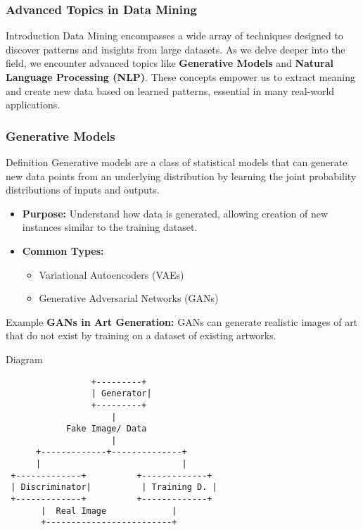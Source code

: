 \documentclass[aspectratio=169]{beamer}
\begin{document}
\begin{frame}
    \frametitle{Advanced Topics in Data Mining}
    \begin{block}{Introduction}
        Data Mining encompasses a wide array of techniques designed to discover patterns and insights from large datasets. 
        As we delve deeper into the field, we encounter advanced topics like \textbf{Generative Models} and \textbf{Natural Language Processing (NLP)}. 
        These concepts empower us to extract meaning and create new data based on learned patterns, essential in many real-world applications.
    \end{block}
\end{frame}

\begin{frame}
    \frametitle{Generative Models}
    \begin{block}{Definition}
        Generative models are a class of statistical models that can generate new data points from an underlying distribution by learning the joint probability distributions of inputs and outputs.
    \end{block}
    
    \begin{itemize}
        \item \textbf{Purpose:} Understand how data is generated, allowing creation of new instances similar to the training dataset.
        \item \textbf{Common Types:} 
            \begin{itemize}
                \item Variational Autoencoders (VAEs)
                \item Generative Adversarial Networks (GANs)
            \end{itemize}
    \end{itemize}
    
    \begin{block}{Example}
        \textbf{GANs in Art Generation:} GANs can generate realistic images of art that do not exist by training on a dataset of existing artworks.
    \end{block}
    
    \begin{block}{Diagram}
        \begin{verbatim}
                 +---------+
                 | Generator|
                 +---------+
                     |     
            Fake Image/ Data
                     |
      +-------------+--------------+
      |                            |
 +-------------+          +-------------+
 | Discriminator|          | Training D. |
 +-------------+          +-------------+
       |  Real Image             |
       +-------------------------+
        \end{verbatim}
    \end{block}
\end{frame}
\end{document}
